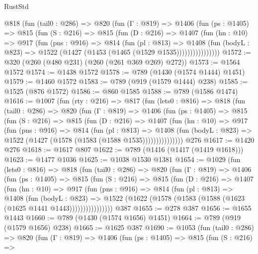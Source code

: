 \begin{lexlean}{RustStd}
\begin{coremodule}
        @818
          (fun (tail0 : @286) =>
          @820
            (fun (Γ : @819) =>
            @1406
              (fun (ps : @1405) =>
              @815
                (fun (S : @216) =>
                @815
                  (fun (D : @216) =>
                  @1407
                    (fun (hn : @10) =>
                    @917
                      (fun (pns : @916) =>
                      @814
                        (fun (pl : @813) =>
                        @1408
                          (fun (bodyL : @823) =>
                          @1522 (@1427 (@1453 (@1465 (@1529 @1535))))))))))))))))
@1572 := @320 (@260 (@480 @231) (@260 (@261 @369 @269) @272))
@1573 := @1564 @1572
@1574 := @1438 @1572
@1578 := @789 (@1430 (@1574 @1444) @1451)
@1579 := @1460 @1572
@1583 := @789 (@919 (@1579 @1444) @238)
@1585 := @1525 (@876 @1572)
@1586 := @860 @1585
@1588 := @789 (@1586 @1474)
@1616 := @1007
    (fun (rty : @216) =>
    @817
      (fun (lets0 : @816) =>
      @818
        (fun (tail0 : @286) =>
        @820
          (fun (Γ : @819) =>
          @1406
            (fun (ps : @1405) =>
            @815
              (fun (S : @216) =>
              @815
                (fun (D : @216) =>
                @1407
                  (fun (hn : @10) =>
                  @917
                    (fun (pns : @916) =>
                    @814
                      (fun (pl : @813) =>
                      @1408
                        (fun (bodyL : @823) =>
                        @1522 (@1427 (@1578 (@1583 (@1588 @1535)))))))))))))))
    @276
@1617 := @1420 @276
@1618 := @1617 @807
@1622 := @789 (@1416 (@1417 (@1419 @1618)))
@1623 := @1477 @1036
@1625 := @1038 @1530 @1381
@1654 := @1029
    (fun (lets0 : @816) =>
    @818
      (fun (tail0 : @286) =>
      @820
        (fun (Γ : @819) =>
        @1406
          (fun (ps : @1405) =>
          @815
            (fun (S : @216) =>
            @815
              (fun (D : @216) =>
              @1407
                (fun (hn : @10) =>
                @917
                  (fun (pns : @916) =>
                  @814
                    (fun (pl : @813) =>
                    @1408
                      (fun (bodyL : @823) =>
                      @1522 (@1622 (@1578 (@1583 (@1588 (@1623 (@1625 @1441 @1443))))))))))))))))
    @387
@1655 := @278 @387
@1656 := @1655 @1443
@1660 := @789 (@1430 (@1574 @1656) @1451)
@1664 := @789 (@919 (@1579 @1656) @238)
@1665 := @1625 @387
@1690 := @1053
    (fun (tail0 : @286) =>
    @820
      (fun (Γ : @819) =>
      @1406
        (fun (ps : @1405) =>
        @815
          (fun (S : @216) =>

\end{coremodule}
\end{lexlean}
